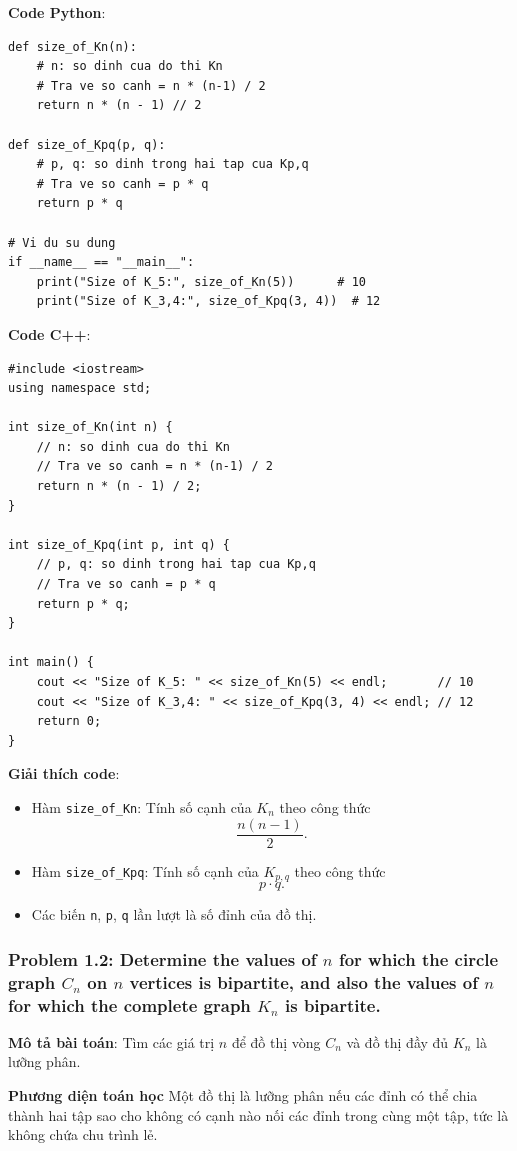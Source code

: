 \documentclass[a4paper,12pt]{article}
\begin{document}
\textbf{Code Python}:
\lstset{language=Python}
\begin{lstlisting}
def size_of_Kn(n):
    # n: so dinh cua do thi Kn
    # Tra ve so canh = n * (n-1) / 2
    return n * (n - 1) // 2

def size_of_Kpq(p, q):
    # p, q: so dinh trong hai tap cua Kp,q
    # Tra ve so canh = p * q
    return p * q

# Vi du su dung
if __name__ == "__main__":
    print("Size of K_5:", size_of_Kn(5))      # 10
    print("Size of K_3,4:", size_of_Kpq(3, 4))  # 12
\end{lstlisting}

\bigskip
\textbf{Code C++}:
\lstset{language=C++}
\begin{lstlisting}
#include <iostream>
using namespace std;

int size_of_Kn(int n) {
    // n: so dinh cua do thi Kn
    // Tra ve so canh = n * (n-1) / 2
    return n * (n - 1) / 2;
}

int size_of_Kpq(int p, int q) {
    // p, q: so dinh trong hai tap cua Kp,q
    // Tra ve so canh = p * q
    return p * q;
}

int main() {
    cout << "Size of K_5: " << size_of_Kn(5) << endl;       // 10
    cout << "Size of K_3,4: " << size_of_Kpq(3, 4) << endl; // 12
    return 0;
}
\end{lstlisting}

\textbf{Giải thích code}:
\begin{itemize}
  \item Hàm \texttt{size\_of\_Kn}: Tính số cạnh của \(K_n\) theo công thức
    \[
      \frac{n(n-1)}{2}.
    \]
  \item Hàm \texttt{size\_of\_Kpq}: Tính số cạnh của \(K_{p,q}\) theo công thức
    \[
      p \cdot q.
    \]
  \item Các biến \texttt{n}, \texttt{p}, \texttt{q} lần lượt là số đỉnh của đồ thị.
\end{itemize}

\subsubsection{Problem 1.2: Determine the values of $n$ for which the circle graph $C_n$ on $n$ vertices is bipartite, and also the values of $n$ for which the complete graph $K_n$ is bipartite.}
\textbf{Mô tả bài toán}: Tìm các giá trị \( n \) để đồ thị vòng \( C_n \) và đồ thị đầy đủ \( K_n \) là lưỡng phân.

\textbf{Phương diện toán học}
Một đồ thị là lưỡng phân nếu các đỉnh có thể chia thành hai tập sao cho không có cạnh nào nối các đỉnh trong cùng một tập, tức là không chứa chu trình lẻ.
\end{document}
